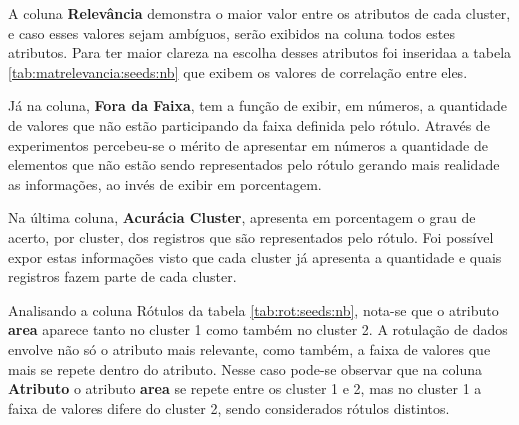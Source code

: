A coluna \textbf{Relevância}  demonstra o maior valor entre os atributos de cada  cluster, e caso esses valores sejam ambíguos, serão exibidos na coluna todos estes  atributos. Para ter maior clareza na escolha desses atributos foi inseridaa a tabela \ref{tab:matrelevancia:seeds:nb} que exibem os valores de correlação entre eles.

Já na coluna, \textbf{Fora da Faixa}, tem a função de exibir, em números, a quantidade de valores que não estão participando da faixa definida pelo rótulo. Através de experimentos percebeu-se o mérito de apresentar em números a quantidade de elementos que não estão sendo representados pelo rótulo gerando mais realidade as informações, ao invés de exibir em porcentagem.

Na última coluna, \textbf{Acurácia Cluster}, apresenta em porcentagem o grau de acerto, por cluster, dos registros que são representados pelo rótulo. Foi possível expor estas informações visto que cada cluster já apresenta a quantidade e quais registros fazem parte de cada cluster.

Analisando a coluna Rótulos da tabela \ref{tab:rot:seeds:nb}, nota-se que o atributo \textbf{area} aparece tanto no  cluster 1 como também no cluster 2. A rotulação de dados envolve não só o atributo mais relevante, como também, a faixa de valores que mais se repete dentro do atributo. Nesse caso pode-se observar que na coluna \textbf{Atributo} o atributo \textbf{area} se repete entre os cluster  1 e 2, mas no cluster 1 a faixa de valores difere do cluster 2, sendo considerados rótulos distintos.




